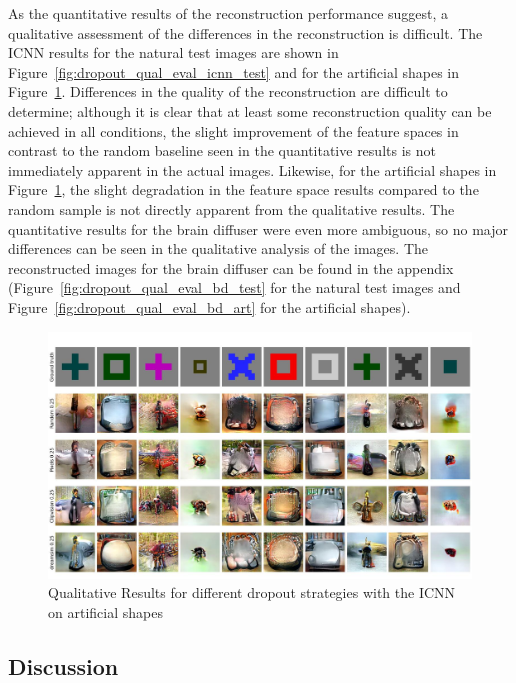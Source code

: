 As the quantitative results of the reconstruction performance suggest, a qualitative assessment of the differences in the reconstruction is difficult. The ICNN results for the natural test images are shown in Figure~\ref{fig:dropout_qual_eval_icnn_test} and for the artificial shapes in Figure~\ref{fig:dropout_qual_eval_icnn_art}. Differences in the quality of the reconstruction are difficult to determine; although it is clear that at least some reconstruction quality can be achieved in all conditions, the slight improvement of the feature spaces in contrast to the random baseline  seen in the quantitative results is not immediately apparent in the actual images. Likewise, for the artificial shapes in Figure~\ref{fig:dropout_qual_eval_icnn_art}, the slight degradation in the feature space results compared to the random sample is not directly apparent from the qualitative results. The quantitative results for the brain diffuser were even more ambiguous, so no major differences can be seen in the qualitative analysis of the images. The reconstructed images for the brain diffuser can be found in the appendix (Figure~\ref{fig:dropout_qual_eval_bd_test} for the natural test images and Figure~\ref{fig:dropout_qual_eval_bd_art} for the artificial shapes).


\begin{figure}[ht]
  \centering
  \includegraphics[width=1\textwidth]{plots/dropout_qual_eval_icnn_art.JPEG}
  \caption{Qualitative Results for different dropout strategies with the ICNN on artificial shapes}\label{fig:dropout_qual_eval_icnn_art}
\end{figure}

\subsection{Discussion}

